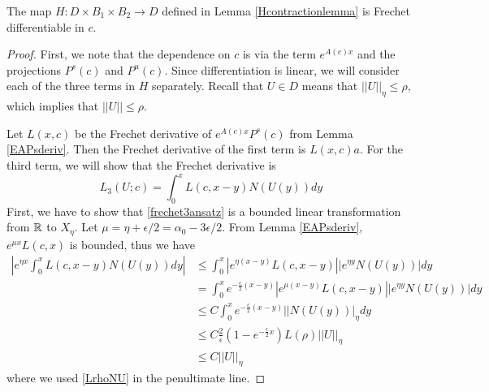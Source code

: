 \documentclass[thesis.tex]{subfiles}
\begin{document}
\begin{lemma}\label{HFrechetlemma}
The map $H: D \times B_1 \times B_2 \rightarrow D$ defined in Lemma \ref{Hcontractionlemma} is Frechet differentiable in $c$.
\begin{proof}
First, we note that the dependence on $c$ is via the term $e^{A(c)x}$ and the projections $P^s(c)$ and $P^u(c)$. Since differentiation is linear, we will consider each of the three terms in $H$ separately. Recall that $U \in D$ means that $||U||_\eta \leq \rho$, which implies that $||U|| \leq \rho$.

Let $L(x, c)$ be the Frechet derivative of $e^{A(c)x} P^s(c)$ from Lemma \ref{EAPsderiv}. Then the Frechet derivative of the first term is $L(x, c)a$. For the third term, we will show that the Frechet derivative is
\begin{equation}\label{frechet3ansatz}
L_3(U; c) = \int_0^x L(c, x - y) N(U(y)) dy
\end{equation}
First, we have to show that \eqref{frechet3ansatz} is a bounded linear transformation from $\mathbb{R}$ to $X_\eta$. Let $\mu = \eta + \epsilon/2 = \alpha_0 - 3\epsilon/2$. From Lemma \ref{EAPsderiv}, $e^{\mu x} L(c,x)$ is bounded, thus we have
\begin{align*}
\left| e^{\eta x} \int_0^x L(c, x - y) N(U(y)) dy \right| &\leq \int_0^x |e^{\eta (x-y)} L(c, x - y)| |e^{\eta y} N(U(y))| dy \\
&= \int_0^x e^{-\frac{\epsilon}{2}(x-y)} |e^{\mu (x-y)} L(c, x - y)| |e^{\eta y} N(U(y))| dy \\
&\leq C \int_0^x e^{-\frac{\epsilon}{2}(x-y)} || N(U(y))|_\eta dy \\
&\leq C \frac{2}{\epsilon}\left(1 - e^{-\frac{\epsilon}{2}x}\right) L(\rho)||U||_\eta \\
&\leq C ||U||_\eta
\end{align*}
where we used \eqref{LrhoNU} in the penultimate line. 


\end{proof}
\end{lemma}
\end{document}
